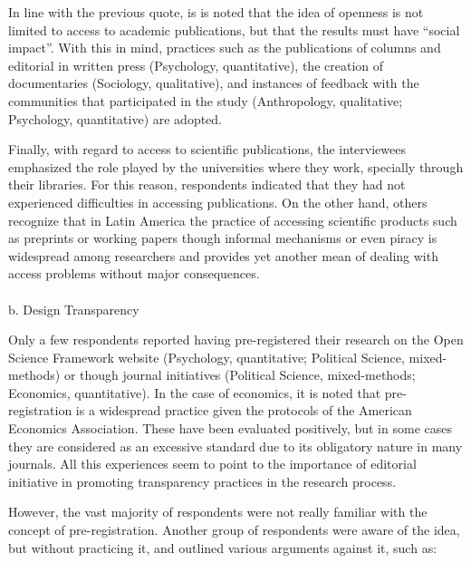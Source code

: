 \documentclass[
  letterpaper,
]{article}
\makeatletter
\let\oldparagraph\paragraph
\renewcommand{\paragraph}{
    \@ifstar
      \xxxParagraphStar
      \xxxParagraphNoStar
  }
\newcommand{\xxxParagraphStar}[1]{\oldparagraph*{#1}\mbox{}}
\newcommand{\xxxParagraphNoStar}[1]{\oldparagraph{#1}\mbox{}}
\makeatother
\begin{document}
In line with the previous quote, is is noted that the idea of openness
is not limited to access to academic publications, but that the results
must have ``social impact''. With this in mind, practices such as the
publications of columns and editorial in written press (Psychology,
quantitative), the creation of documentaries (Sociology, qualitative),
and instances of feedback with the communities that participated in the
study (Anthropology, qualitative; Psychology, quantitative) are adopted.

Finally, with regard to access to scientific publications, the
interviewees emphasized the role played by the universities where they
work, specially through their libraries. For this reason, respondents
indicated that they had not experienced difficulties in accessing
publications. On the other hand, others recognize that in Latin America
the practice of accessing scientific products such as preprints or
working papers though informal mechanisms or even piracy is widespread
among researchers and provides yet another mean of dealing with access
problems without major consequences.

\paragraph{b. Design Transparency}\label{b.-design-transparency}

Only a few respondents reported having pre-registered their research on
the Open Science Framework website (Psychology, quantitative; Political
Science, mixed-methods) or though journal initiatives (Political
Science, mixed-methods; Economics, quantitative). In the case of
economics, it is noted that pre-registration is a widespread practice
given the protocols of the American Economics Association. These have
been evaluated positively, but in some cases they are considered as an
excessive standard due to its obligatory nature in many journals. All
this experiences seem to point to the importance of editorial initiative
in promoting transparency practices in the research process.

However, the vast majority of respondents were not really familiar with
the concept of pre-registration. Another group of respondents were aware
of the idea, but without practicing it, and outlined various arguments
against it, such as:
\end{document}
